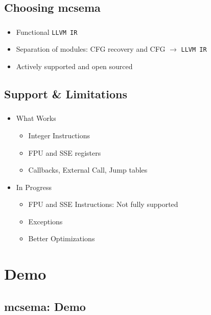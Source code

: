 \documentclass[mathserif,10pt]{beamer}
\newcommand{\LIR}{{\tt LLVM IR}}
\begin{document}
  \subsection{Choosing mcsema}
  \frame
  {
    \frametitle{\subsecname}
    \begin{itemize}
      \item Functional \LIR
      \item Separation of modules: CFG recovery and CFG $\rightarrow$ \LIR
      \item Actively supported and open sourced
    \end{itemize}

    \begin{figure}[h]
      \centering
    \end{figure}
  }

  \subsection{Support \& Limitations}
  \frame
  {
    \frametitle{\subsecname}
    \begin{itemize}
      \item What Works
        \begin{itemize}
          \item Integer Instructions
          \item FPU and SSE registers
          \item Callbacks, External Call, Jump tables 
        \end{itemize}
      \item In Progress
        \begin{itemize}
          \item FPU and SSE Instructions: Not fully supported
          \item Exceptions
          \item Better Optimizations
        \end{itemize}
    \end{itemize}
  }

\section{Demo}
  \subsection{mcsema: Demo}
  \frame
  {
    \frametitle{\subsecname}
  }
\end{document}
